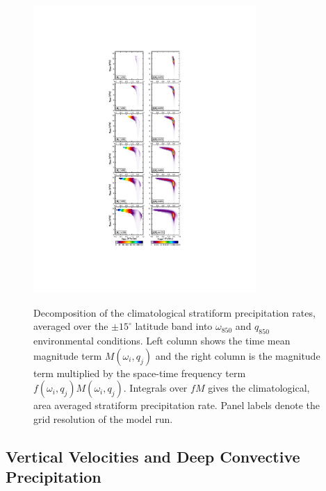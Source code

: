 \documentclass[alpha-refs]{wiley-article}
\begin{document}
\begin{figure}
\begin{center}
\noindent\includegraphics[width=20pc,angle=0]{figs/temp_pdecomp.pdf}\\
\end{center}
\caption{Decomposition of the climatological stratiform precipitation rates, averaged over the $\pm 15^{\circ}$ latitude band into $\omega_{850}$ and $q_{850}$ environmental conditions. Left column shows the time mean magnitude term $M\left( \omega_i , q_j \right)$ and the right column is the magnitude term multiplied by the space-time frequency term $f\left( \omega_i , q_j \right) M\left( \omega_i , q_j \right)$. Integrals over $f M$ gives the climatological, area averaged stratiform precipitation rate. Panel labels denote the grid resolution of the model run.}
\label{fig:pdecomp}
\end{figure}

\subsection{Vertical Velocities and Deep Convective Precipitation}
\end{document}
